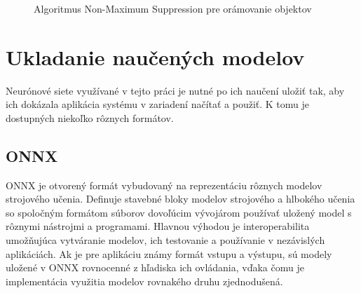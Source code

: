 \begin{figure}[H]
                \caption{Algoritmus Non-Maximum Suppression pre orámovanie objektov}
            \end{figure}

\chapter{Ukladanie naučených modelov}
    Neurónové siete využívané v tejto práci je nutné po ich naučení uložiť tak, aby ich dokázala aplikácia systému v zariadení načítať a použiť. K tomu je dostupných niekoľko rôznych formátov.

    \section{ONNX}
        ONNX je otvorený formát vybudovaný na reprezentáciu rôznych modelov strojového učenia. Definuje stavebné bloky modelov strojového a hlbokého učenia so spoločným formátom súborov dovoľúcim vývojárom používať uložený model s rôznymi nástrojmi a programami. Hlavnou výhodou je interoperabilita umožňujúca vytváranie modelov, ich testovanie a používanie v nezávislých aplikáciách. Ak je pre aplikáciu známy formát vstupu a výstupu, sú modely uložené v ONNX rovnocenné z hľadiska ich ovládania, vďaka čomu je implementácia využitia modelov rovnakého druhu zjednodušená.

